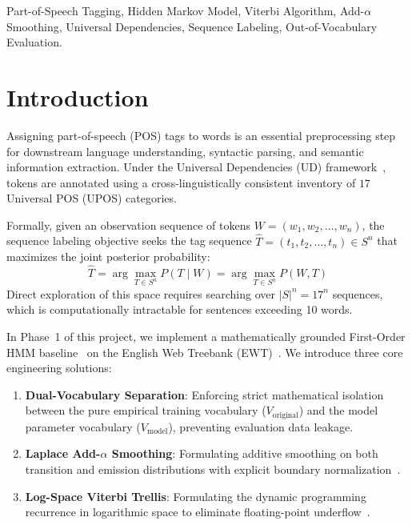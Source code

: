 \documentclass[conference]{IEEEtran}
\begin{document}
\begin{IEEEkeywords}
Part-of-Speech Tagging, Hidden Markov Model, Viterbi Algorithm, Add-$\alpha$ Smoothing, Universal Dependencies, Sequence Labeling, Out-of-Vocabulary Evaluation.
\end{IEEEkeywords}

\section{Introduction}
Assigning part-of-speech (POS) tags to words is an essential preprocessing step for downstream language understanding, syntactic parsing, and semantic information extraction. Under the Universal Dependencies (UD) framework~\cite{nivre2020universal}, tokens are annotated using a cross-linguistically consistent inventory of $17$ Universal POS (UPOS) categories.

Formally, given an observation sequence of tokens $W = (w_1, w_2, \dots, w_n)$, the sequence labeling objective seeks the tag sequence $\hat{T} = (t_1, t_2, \dots, t_n) \in S^n$ that maximizes the joint posterior probability:
\begin{equation}
\hat{T} = \arg\max_{T \in S^n} P(T \mid W) = \arg\max_{T \in S^n} P(W, T)
\end{equation}
Direct exploration of this space requires searching over $|S|^n = 17^n$ sequences, which is computationally intractable for sentences exceeding 10 words.

In Phase~1 of this project, we implement a mathematically grounded First-Order HMM baseline~\cite{rabiner1989tutorial, church1988stochastic} on the English Web Treebank (EWT)~\cite{silveira2014gold}. We introduce three core engineering solutions:
\begin{enumerate}
    \item \textbf{Dual-Vocabulary Separation}: Enforcing strict mathematical isolation between the pure empirical training vocabulary ($V_{\text{original}}$) and the model parameter vocabulary ($V_{\text{model}}$), preventing evaluation data leakage.
    \item \textbf{Laplace Add-$\alpha$ Smoothing}: Formulating additive smoothing on both transition and emission distributions with explicit boundary normalization~\cite{brants2000tnt}.
    \item \textbf{Log-Space Viterbi Trellis}: Formulating the dynamic programming recurrence in logarithmic space to eliminate floating-point underflow~\cite{jurafsky2026sequence}.
\end{enumerate}
\end{document}
